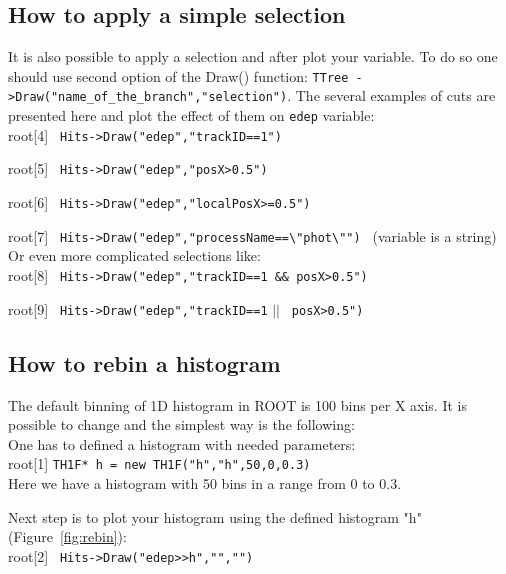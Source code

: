 \documentclass[12pt]{article}
\begin{document}
\clearpage
\subsection{How to apply a simple selection}
It is also possible to apply a selection and after plot your variable. To do so one should use second option of the Draw() function: \verb|TTree ->Draw("name_of_the_branch","selection")|. The several examples of cuts are presented here and plot the effect of them on \verb|edep| variable:\\

root[4] \verb| Hits->Draw("edep","trackID==1") |

root[5] \verb| Hits->Draw("edep","posX>0.5") |

root[6] \verb| Hits->Draw("edep","localPosX>=0.5") |

root[7] \verb| Hits->Draw("edep","processName==\"phot\"") | (variable is a string)\\

Or even more complicated selections like: \\

root[8] \verb| Hits->Draw("edep","trackID==1 && posX>0.5") |

root[9] \verb| Hits->Draw("edep","trackID==1| $||$ \verb| posX>0.5") |\\

\subsection{How to rebin a histogram}
The default binning of 1D histogram in ROOT is 100 bins per X axis. It is possible to change and the simplest way is the following:\\
One has to defined a histogram with needed parameters:\\

root[1] \verb|TH1F* h = new TH1F("h","h",50,0,0.3) |\\

Here  we have a histogram with 50 bins in a range from 0 to 0.3.

Next step is to plot your histogram using the defined histogram "h" (Figure~\ref{fig:rebin}): \\

root[2] \verb| Hits->Draw("edep>>h","","") |
\end{document}

